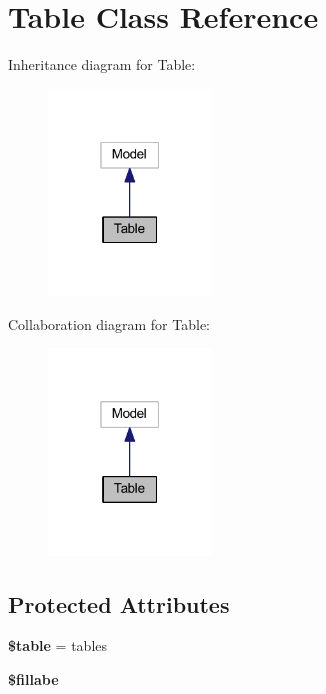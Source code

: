 \hypertarget{class_app_1_1_models_1_1_table}{}\section{Table Class Reference}
\label{class_app_1_1_models_1_1_table}


Inheritance diagram for Table\+:
\nopagebreak
\begin{figure}[H]
\begin{center}
\leavevmode
\includegraphics[width=123pt]{class_app_1_1_models_1_1_table__inherit__graph}
\end{center}
\end{figure}


Collaboration diagram for Table\+:
\nopagebreak
\begin{figure}[H]
\begin{center}
\leavevmode
\includegraphics[width=123pt]{class_app_1_1_models_1_1_table__coll__graph}
\end{center}
\end{figure}
\subsection*{Protected Attributes}
\begin{DoxyCompactItemize}
\item 
\mbox{\label{class_app_1_1_models_1_1_table_ae8876a14058f368335baccf35af4a22b}} 
{\bfseries \$table} = \textquotesingle{}tables\textquotesingle{}
\item 
{\bfseries \$fillabe}
\end{DoxyCompactItemize}


